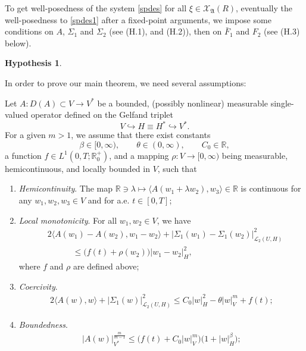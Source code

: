 \documentclass[english,a4paper,11pt]{amsart}
\theoremstyle{plain}
\theoremstyle{definition}
\newtheorem{hypo}[theorem]{Hypothesis}
\theoremstyle{remark}
\renewcommand{\emph}[1]{{\sl #1}}
\numberwithin{equation}{section}
\newcommand{\MA}{\mathfrak{A}}
\newcommand{\la}{\langle}
\newcommand{\ra}{\rangle}
\newcommand{\R}{\mathbb{R}}
\renewcommand{\emph}[1]{{\sl #1}}
\begin{document}
To get well-posedness of the system \eqref{spdes} for all $\xi\in 	\mathcal{X}_{\MA}(R)$, eventually the well-posedness to \eqref{spdes1} after a fixed-point arguments, we impose some conditions on $A$, $\Sigma_1$ and $\Sigma_2$ (see (H.1), and (H.2)), then on $\bar F_1$ and $F_2$ (see (H.3) below).
 
 
	\begin{hypo}\label{hyp}
	
		In order to prove our main theorem, we need several assumptions: 
		
		\medskip 
		
		\item[(H.1)]
	Let 	$A:D(A)\subset V \to V^\ast$ be a bounded, (possibly nonlinear) measurable 
		single-valued operator defined on the Gelfand triplet 
		\[
		V \hookrightarrow H \equiv H^\ast \hookrightarrow V^\ast.
		\]
	For a given $m>1$, we	assume that there exist  constants 
		\[
		 \beta\in [0,\infty), \qquad \theta\in (0,\infty), 
		\qquad C_0\in \mathbb{R},
		\]
a function $f \in L^1(0,T;\mathbb{R}^+_0)$,  and a mapping $\rho:V \to [0,\infty)$ being  measurable, hemicontinuous, and locally bounded in $V$, such that 	
		\begin{enumerate}
			\item\label{HC} \emph{Hemicontinuity}. The map $\R \ni \lambda \mapsto \langle A(w_1+\lambda w_2), w_3\rangle \in\R$ is continuous for any $w_1,w_2,w_3\in V$ and for a.e. $t\in[0,T]$;
			\item\label{WM} \emph{Local monotonicity}. For all $w_1,w_2\in V$,  we have
			\begin{align*}
			&	2\la A(w_1)-A(w_2), w_1-w_2\ra + {|\Sigma_1(w_1)-\Sigma_1(w_2)|_{\mathcal{L}_2(U,H)}^2} \\
				& \qquad\quad \leq \big(f (t)+{\rho(w_2)}\big) |w_1-w_2|_H^2,
			\end{align*}where $f$ and $\rho$ are defined above;
		\item\label{C} \emph{Coercivity}. 
		\begin{align*}
			2\la A (w),w\ra +|\Sigma_1(w)|_{\mathcal{L}_2(U,H)}^2\leq C_0|w|_H^2-\theta |w|_V^m+f (t);
		\end{align*}
	\item\label{G} \emph{Boundedness}. 
	\begin{align*}
		|A(w)|_{V^\ast}^{\frac{m}{m-1}} \leq \big(f (t)+C_0|w|_V^m \big)\big(1+|w|_H^\beta\big);
	\end{align*}
		\end{enumerate}
		

\end{hypo}
\end{document}
